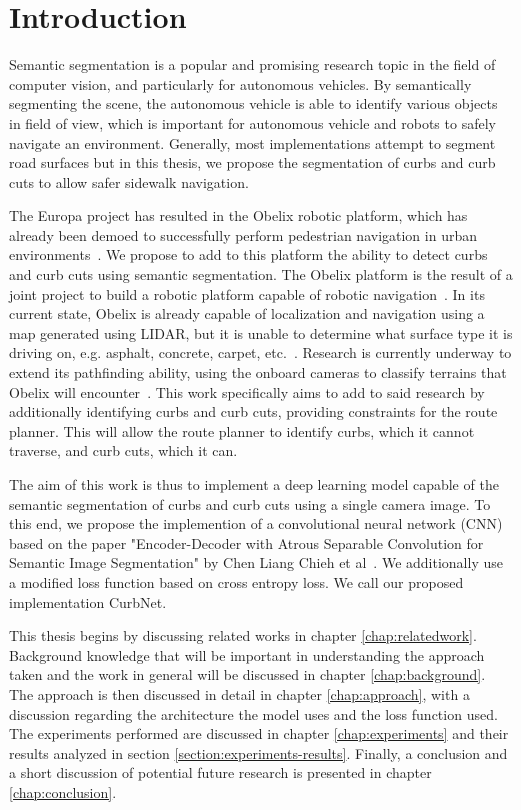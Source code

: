 \chapter{Introduction}\label{chap:introduction}
Semantic segmentation is a popular and promising research topic in the field of computer vision, and particularly for autonomous vehicles.
By semantically segmenting the scene, the autonomous vehicle is able to identify various objects in field of view, which is important for autonomous vehicle and robots to safely navigate an environment.
Generally, most implementations attempt to segment road surfaces but in this thesis, we propose the segmentation of curbs and curb cuts to allow safer sidewalk navigation.

The Europa project has resulted in the Obelix robotic platform, which has already been demoed to successfully perform pedestrian navigation in urban environments~\cite{europa}\cite{obelix-slam}.
We propose to add to this platform the ability to detect curbs and curb cuts using semantic segmentation.
The Obelix platform is the result of a joint project to build a robotic platform capable of robotic navigation~\cite{europa}. 
In its current state, Obelix is already capable of localization and navigation using a map generated using LIDAR, but it is unable to determine what surface type it is driving on, e.g. asphalt, concrete, carpet, etc.~\cite{jannik}.
Research is currently underway to extend its pathfinding ability, using the onboard cameras to classify terrains that Obelix will encounter~\cite{jannik}.
This work specifically aims to add to said research by additionally identifying curbs and curb cuts, providing constraints for the route planner.
This will allow the route planner to identify curbs, which it cannot traverse, and curb cuts, which it can.



The aim of this work is thus to implement a deep learning model capable of the semantic segmentation of curbs and curb cuts using a single camera image.
To this end, we propose the implemention of a convolutional neural network (CNN) based on the paper "Encoder-Decoder with Atrous Separable Convolution for Semantic Image Segmentation" by Chen Liang Chieh et al~\cite{deeplab}.
We additionally use a modified loss function based on cross entropy loss.
We call our proposed implementation CurbNet.

This thesis begins by discussing related works in chapter \ref{chap:relatedwork}. 
Background knowledge that will be important in understanding the approach taken and the work in general will be discussed in chapter \ref{chap:background}.
The approach is then discussed in detail in chapter \ref{chap:approach}, with a discussion regarding the architecture the model uses and the loss function used.
The experiments performed are discussed in chapter \ref{chap:experiments} and their results analyzed in section \ref{section:experiments-results}.
Finally, a conclusion and a short discussion of potential future research is presented in chapter \ref{chap:conclusion}.